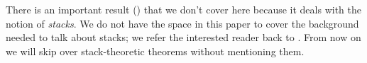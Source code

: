 
        \begin{note}\label{nt:no-theorem-2.5}
            There is an important result (\cite[Théorème~2.5, \S2.1, p.11]{Toen:2005wxa}) that we don't cover here because it deals with the notion of \emph{stacks}.
            We do not have the space in this paper to cover the background needed to talk about stacks; we refer the interested reader back to \cite{Toen:2005wxa}.
            From now on we will skip over stack-theoretic theorems without mentioning them.
        \end{note}


